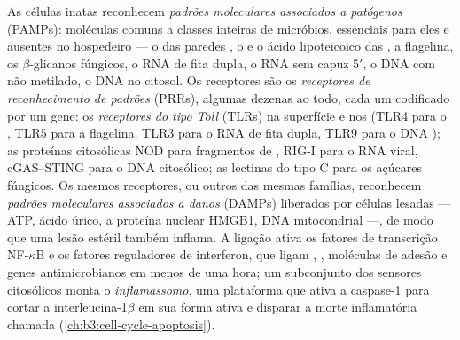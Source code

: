 \begin{definition}\label{def:b3:innate-immunity:prr}
As células inatas reconhecem \emph{padrões moleculares associados a
patógenos} (PAMPs): moléculas comuns a classes inteiras de micróbios,
essenciais para eles e ausentes no hospedeiro --- o 
das paredes , o  e o ácido lipoteicoico das
, a flagelina, os $\beta$-glicanos fúngicos, o RNA de
fita dupla, o RNA sem capuz 5$'$, o DNA com  não metilado, o DNA no
citosol. Os receptores são os \emph{receptores de reconhecimento de
padrões} (PRRs), algumas dezenas ao todo, cada um codificado por um
gene: os \emph{receptores do tipo Toll} (TLRs) na superfície e nos
 (TLR4 para o , TLR5 para a flagelina, TLR3
para o RNA de fita dupla, TLR9 para o DNA ); as proteínas
citosólicas NOD para fragmentos de , RIG-I para o RNA
viral, cGAS--STING para o DNA citosólico; as lectinas do tipo C para os
açúcares fúngicos. Os mesmos receptores, ou outros das mesmas famílias,
reconhecem \emph{padrões moleculares associados a danos} (DAMPs)
liberados por células lesadas --- ATP, ácido úrico, a proteína nuclear
HMGB1, DNA mitocondrial ---, de modo que uma lesão estéril também
inflama. A ligação ativa os fatores de transcrição NF-$\kappa$B e os
fatores reguladores de interferon, que ligam , ,
moléculas de adesão e genes antimicrobianos em menos de uma hora; um
subconjunto dos sensores citosólicos monta o \emph{inflamassomo}, uma
plataforma que ativa a caspase-1 para cortar a interleucina-1$\beta$ em
sua forma ativa e disparar a morte inflamatória chamada 
(\cref{ch:b3:cell-cycle-apoptosis}).
\end{definition}

